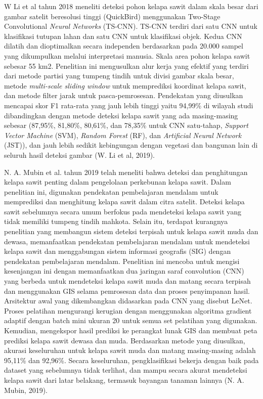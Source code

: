 W Li et al tahun 2018 meneliti deteksi pohon kelapa sawit dalam skala besar dari gambar satelit beresolusi tinggi (QuickBird) menggunakan Two-Stage Convolutional \textit{Neural Networks} (TS-CNN). TS-CNN terdiri dari satu CNN untuk klasifikasi tutupan lahan dan satu CNN untuk klasifikasi objek. Kedua CNN dilatih dan dioptimalkan secara independen berdasarkan pada 20.000 sampel yang dikumpulkan melalui interpretasi manusia. Skala area pohon kelapa sawit sebesar 55 km2. Penelitian ini mengusulkan alur kerja yang efektif yang terdiri dari metode partisi yang tumpeng tindih untuk divisi gambar skala besar, metode \textit{multi-scale sliding window} untuk memprediksi koordinat kelapa sawit, dan metode filter jarak untuk pasca-pemrosesan. Pendekatan yang diusulkan mencapai skor F1 rata-rata yang jauh lebih tinggi yaitu 94,99\% di wilayah studi dibandingkan dengan metode deteksi kelapa sawit yang ada masing-masing sebesar (87,95\%, 81,80\%, 80,61\%, dan 78,35\% untuk CNN satu-tahap, \textit{Support Vector Machine} (SVM), \textit{Random Forest} (RF), dan \textit{Artificial Neural Network} (JST)), dan jauh lebih sedikit kebingungan dengan vegetasi dan bangunan lain di seluruh hasil deteksi gambar (W. Li et al, 2019).

N. A. Mubin et al. tahun 2019 telah meneliti bahwa deteksi dan penghitungan kelapa sawit penting dalam pengelolaan perkebunan kelapa sawit. Dalam penelitian ini, digunakan pendekatan pembelajaran mendalam untuk memprediksi dan menghitung kelapa sawit dalam citra satelit. Deteksi kelapa sawit sebelumnya secara umum berfokus pada mendeteksi kelapa sawit yang tidak memiliki tumpeng tindih mahkota. Selain itu, terdapat kurangnya penelitian yang membangun sistem deteksi terpisah untuk kelapa sawit muda dan dewasa, memanfaatkan pendekatan pembelajaran mendalam untuk mendeteksi kelapa sawit dan menggabungan sistem informasi geografis (SIG) dengan pendekatan pembelajaran mendalam. Penelitian ini mencoba untuk mengisi kesenjangan ini dengan memanfaatkan dua jaringan saraf convolution (CNN) yang berbeda untuk mendeteksi kelapa sawit muda dan matang secara terpisah dan menggunakan GIS selama pemrosesan data dan proses penyimpanan hasil. Arsitektur awal yang dikembangkan didasarkan pada CNN yang disebut LeNet. Proses pelatihan mengurangi kerugian dengan menggunakan algoritma gradient adaptif dengan batch mini ukuran 20 untuk semua set pelatihan yang digunakan. Kemudian, mengekspor hasil prediksi ke perangkat lunak GIS dan membuat peta prediksi kelapa sawit dewasa dan muda. Berdasarkan metode yang diusulkan, akurasi keseluruhan untuk kelapa sawit muda dan matang masing-masing adalah 95,11\% dan 92,96\%. Secara keseluruhan, pengklasifikasi bekerja dengan baik pada dataset yang sebelumnya tidak terlihat, dan mampu secara akurat mendeteksi kelapa sawit dari latar belakang, termasuk bayangan tanaman lainnya (N. A. Mubin, 2019). 

